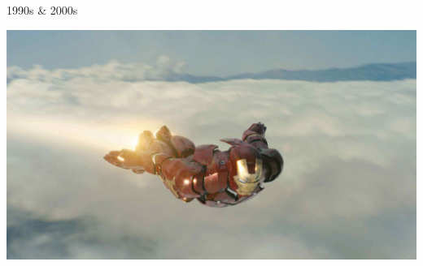 \documentclass{lug}
\begin{document}
\begin{frame}{1990s \& 2000s}
\begin{minipage}{.35\textwidth}
        \includegraphics[width=\textwidth]{graphics/iron_man_2008}
    \end{minipage}
\end{frame}
\end{document}
